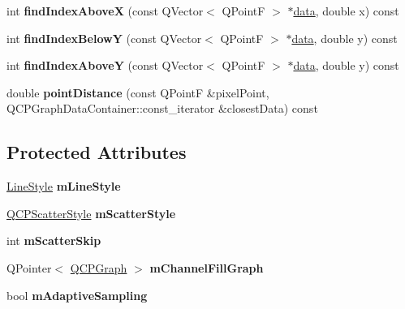 \begin{DoxyCompactItemize}
int {\bfseries find\+Index\+AboveX} (const Q\+Vector$<$ Q\+PointF $>$ $\ast$\hyperlink{class_q_c_p_graph_a141aa31a1f19bbd0ce60f55eaeb9ea60}{data}, double x) const
\item 
\mbox{\label{class_q_c_p_graph_a5b0291f248e8ca8eaa82833ab420dcd0}} 
int {\bfseries find\+Index\+BelowY} (const Q\+Vector$<$ Q\+PointF $>$ $\ast$\hyperlink{class_q_c_p_graph_a141aa31a1f19bbd0ce60f55eaeb9ea60}{data}, double y) const
\item 
\mbox{\label{class_q_c_p_graph_a8b952a5f937840dc242489585cc8000d}} 
int {\bfseries find\+Index\+AboveY} (const Q\+Vector$<$ Q\+PointF $>$ $\ast$\hyperlink{class_q_c_p_graph_a141aa31a1f19bbd0ce60f55eaeb9ea60}{data}, double y) const
\item 
\mbox{\label{class_q_c_p_graph_a89acf99c0b52b8eecb2438adf7ec0170}} 
double {\bfseries point\+Distance} (const Q\+PointF \&pixel\+Point, Q\+C\+P\+Graph\+Data\+Container\+::const\+\_\+iterator \&closest\+Data) const
\end{DoxyCompactItemize}
\subsection*{Protected Attributes}
\begin{DoxyCompactItemize}
\item 
\mbox{\label{class_q_c_p_graph_a8604fd98402035a63375849f7341ee25}} 
\hyperlink{class_q_c_p_graph_ad60175cd9b5cac937c5ee685c32c0859}{Line\+Style} {\bfseries m\+Line\+Style}
\item 
\mbox{\label{class_q_c_p_graph_a4aa36241f166ccd1f75fc8f24e4a3247}} 
\hyperlink{class_q_c_p_scatter_style}{Q\+C\+P\+Scatter\+Style} {\bfseries m\+Scatter\+Style}
\item 
\mbox{\label{class_q_c_p_graph_a4ca1e50fbfe8307022b42a6f6178fae0}} 
int {\bfseries m\+Scatter\+Skip}
\item 
\mbox{\label{class_q_c_p_graph_a2f1777c7accf8244fc640c33f0b04577}} 
Q\+Pointer$<$ \hyperlink{class_q_c_p_graph}{Q\+C\+P\+Graph} $>$ {\bfseries m\+Channel\+Fill\+Graph}
\item 
\mbox{\label{class_q_c_p_graph_aa951e78aeba714cf443be6da2e52502e}} 
bool {\bfseries m\+Adaptive\+Sampling}
\end{DoxyCompactItemize}

